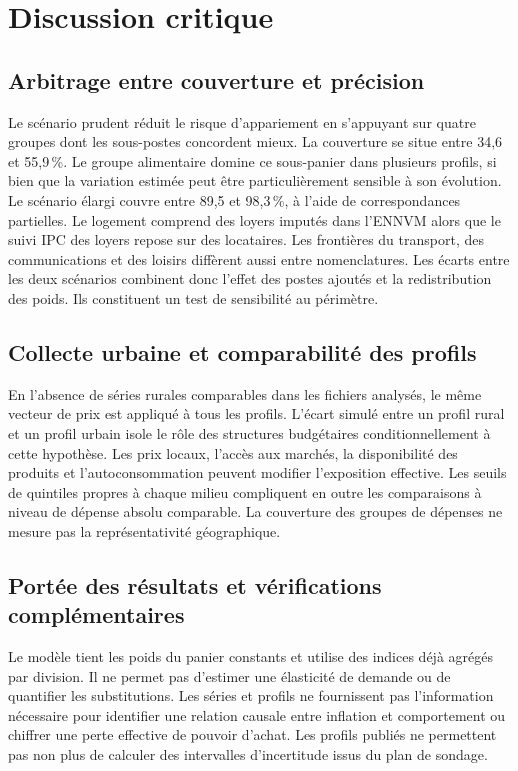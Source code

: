 \chapter{Discussion critique}
\section{Arbitrage entre couverture et précision}
Le scénario prudent réduit le risque d'appariement en s'appuyant sur quatre groupes dont les sous-postes concordent mieux. La couverture se situe entre 34,6 et 55,9\,\%. Le groupe alimentaire domine ce sous-panier dans plusieurs profils, si bien que la variation estimée peut être particulièrement sensible à son évolution. Le scénario élargi couvre entre 89,5 et 98,3\,\%, à l'aide de correspondances partielles. Le logement comprend des loyers imputés dans l'ENNVM alors que le suivi IPC des loyers repose sur des locataires. Les frontières du transport, des communications et des loisirs diffèrent aussi entre nomenclatures. Les écarts entre les deux scénarios combinent donc l'effet des postes ajoutés et la redistribution des poids. Ils constituent un test de sensibilité au périmètre.

\section{Collecte urbaine et comparabilité des profils}
En l'absence de séries rurales comparables dans les fichiers analysés, le même vecteur de prix est appliqué à tous les profils. L'écart simulé entre un profil rural et un profil urbain isole le rôle des structures budgétaires conditionnellement à cette hypothèse. Les prix locaux, l'accès aux marchés, la disponibilité des produits et l'autoconsommation peuvent modifier l'exposition effective. Les seuils de quintiles propres à chaque milieu compliquent en outre les comparaisons à niveau de dépense absolu comparable. La couverture des groupes de dépenses ne mesure pas la représentativité géographique.

\section{Portée des résultats et vérifications complémentaires}
Le modèle tient les poids du panier constants et utilise des indices déjà agrégés par division. Il ne permet pas d'estimer une élasticité de demande ou de quantifier les substitutions. Les séries et profils ne fournissent pas l'information nécessaire pour identifier une relation causale entre inflation et comportement ou chiffrer une perte effective de pouvoir d'achat. Les profils publiés ne permettent pas non plus de calculer des intervalles d'incertitude issus du plan de sondage.

